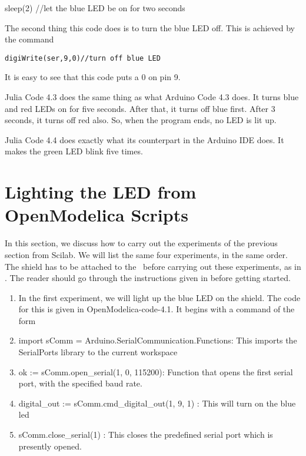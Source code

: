 sleep(2)  //let the blue LED be on for two seconds

The second thing this code does is to turn the blue LED off. This is achieved
by the command

\begin{lstlisting}[style=nonumbers]
     digiWrite(ser,9,0)//turn off blue LED
  \end{lstlisting}

It is easy to see that this code puts a 0 on pin 9.

Julia Code 4.3 does the same thing as what Arduino Code 4.3 does. It turns
blue and red LEDs on for five seconds. After that, it turns off blue first. After
3 seconds, it turns off red also. So, when the program ends, no LED is lit up.

Julia Code 4.4 does exactly what its counterpart in the Arduino IDE does.
It makes the green LED blink five times. 


\section{Lighting the LED from OpenModelica Scripts}
\label{sec:light-OpenModelica}
In this section, we discuss how to carry out the experiments of the
previous section from Scilab.  We will list the same four experiments,
in the same order.  The shield has to be attached to the \arduino\
before carrying out these experiments, as in .
The reader should go through the instructions given in
 before getting started.

\begin{enumerate}
\item In the first experiment, we will light up the blue LED on the
  shield.  The code for this is given in OpenModelica-code-4.1.
    It begins with a command of the form

\item import sComm = Arduino.SerialCommunication.Functions: This imports the SerialPorts library to the current workspace
\item ok := sComm.open\_serial(1, 0, 115200): Function that opens the first serial port, with the specified baud rate.
 
\item digital\_out := sComm.cmd\_digital\_out(1, 9, 1) : This will turn on the blue led
 
\item sComm.close\_serial(1) : This closes the predefined serial port which is presently opened.
\end{enumerate}

